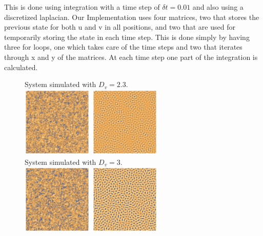 This is done using integration with a time step of $\delta t = 0.01$ and also using a discretized laplacian. Our Implementation uses four matrices, two that stores the previous state for both u and v in all positions, and two that are used for temporarily storing the state in each time step. This is done simply by having three for loops, one which takes care of the time steps and two that iterates through x and y of the matrices. At each time step one part of the integration is calculated.



\begin{figure}[h]
    \centering
    System simulated with $D_v=2.3$.\\
    \includegraphics[width=0.3\textwidth]{img/2bd23transient.png}
    \includegraphics[width=0.3\textwidth]{img/2bd23.png}\\
    System simulated with $D_v=3$.\\
    \includegraphics[width=0.3\textwidth]{img/2bd3transient.png}
    \includegraphics[width=0.3\textwidth]{img/2bd3.png}\\

\end{figure}
